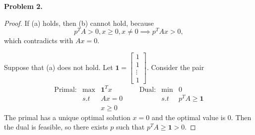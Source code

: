 \documentclass[12pt]{article}
\begin{document}
\vspace{\baselineskip}
\noindent
\textbf{Problem 2.}
\begin{proof}
If (a) holds, then (b) cannot hold, because
\[ p^T A >0, x\ge0, x\ne0 \implies p^T Ax > 0, \] which contradicts with $Ax=0$.

Suppose that (a) does not hold. Let $ \bm{1} = \begin{bmatrix} 1 \\ 1 \\ \vdots \\ 1 \end{bmatrix}$. Consider the pair
\begin{equation*}
  \begin{array}{llllllll}
    \text{Primal:} &\text{max}& \bm{1}^Tx &          &   & \text{Dual:} & \text{min} & 0       \\ 
    & s.t       &  Ax=0  &          & &&  s.t  &   p^T A \ge \bm{1}           \\
    &           & x\ge 0   &         
  \end{array}
\end{equation*}
The primal has a unique optimal solution $x=0$ and the optimal value is 0. Then the dual is feasible, so there exists $p$ such that $p^TA \ge \bm{1} > 0$. 
\end{proof}
\end{document}
